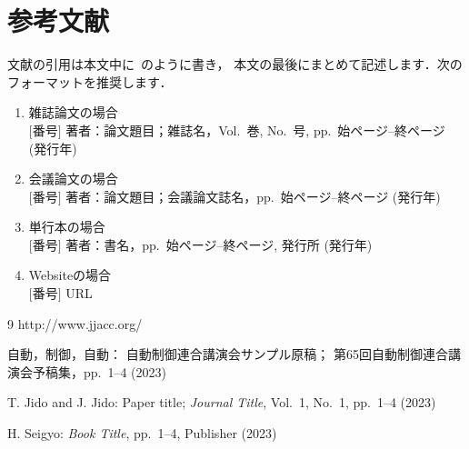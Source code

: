 \documentclass[a4paper]{jarticle}
\begin{document}
\section{参考文献}

文献の引用は本文中に~\cite{web,Conference,Journal}のように書き，
本文の最後にまとめて記述します．次のフォーマットを推奨します．

\begin{enumerate}
  \setlength{\topsep}{0pt}
  \setlength{\partopsep}{0pt}
  \setlength{\itemsep}{0pt}
  \setlength{\parsep}{0pt}
  \setlength{\parskip}{1pt plus 1pt minus 1pt}
	\item[a)] 雑誌論文の場合\\
	$[$番号$]$ 著者：論文題目；雑誌名，Vol.~巻, No.~号, pp.~始ページ--終ページ (発行年)
	\item[b)] 会議論文の場合\\
	$[$番号$]$ 著者：論文題目；会議論文誌名，pp.~始ページ--終ページ (発行年)
	\item[c)] 単行本の場合\\
	$[$番号$]$ 著者：書名，pp.~始ページ--終ページ, 発行所 (発行年)
	\item[c)] Websiteの場合\\
	$[$番号$]$ URL
\end{enumerate}

\begin{thebibliography}{9}
http://www.jjacc.org/

自動，制御，自動：
自動制御連合講演会サンプル原稿；
第65回自動制御連合講演会予稿集，pp.~1--4 (2023)

T. Jido and J. Jido: Paper title; \textit{Journal Title}, Vol.~1, No.~1, pp.~1--4 (2023)

H. Seigyo: \textit{Book Title}, pp.~1--4, Publisher (2023)

\end{thebibliography}
\end{document}
